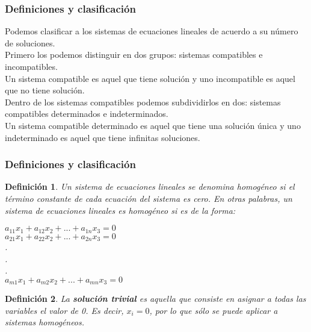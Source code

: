 \documentclass[11pt]{beamer}
\newtheorem{defi}{Definición}
\begin{document}
\begin{frame}
\frametitle{Definiciones y clasificación}
Podemos clasificar a los sistemas de ecuaciones lineales de acuerdo a su número de soluciones. \\
Primero los podemos distinguir en dos grupos: sistemas compatibles e incompatibles.\\
Un sistema compatible es aquel que tiene solución y uno incompatible es aquel que no tiene solución.\\
Dentro de los sistemas compatibles podemos subdividirlos en dos: sistemas compatibles determinados e indeterminados.\\
Un sistema compatible determinado es aquel que tiene una solución única y uno indeterminado es aquel que tiene infinitas soluciones.	
\end{frame}

\begin{frame}
\frametitle{Definiciones y clasificación}
\begin{defi}
Un sistema de ecuaciones lineales se denomina homogéneo si el término constante de cada ecuación del sistema es cero. En otras palabras, un sistema de ecuaciones lineales es homogéneo si es de la forma:\\
\begin{center}
$a_{11}x_1 + a_{12}x_2 + ... + a_{1n}x_3 = 0$\\
$a_{21}x_1 + a_{22}x_2 + ... + a_{2n}x_3 = 0$\\
.\\
.\\
.\\
$a_{m1}x_1 + a_{m2}x_2 + ... + a_{mn}x_3 = 0$
\end{center}
\end{defi}
\begin{defi}
La \textbf{solución trivial} es aquella que consiste en asignar a todas las variables el valor de 0. Es decir, $x_i = 0$, por lo que sólo se puede aplicar a sistemas homogéneos.
\end{defi}	
\end{frame}
\end{document}
